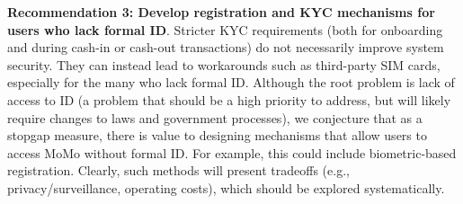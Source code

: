 \noindent \textbf{Recommendation 3: Develop registration and KYC mechanisms for users who lack formal ID}. 
Stricter KYC requirements (both for onboarding and during cash-in or cash-out transactions) do not necessarily improve system security. 
They can instead lead to workarounds such as third-party SIM cards, especially for the many who lack formal ID. 
Although the root problem is lack of access to ID (a problem that should be a high priority to address, but will likely require changes to laws and government processes), we conjecture that as a stopgap measure, there is value to designing mechanisms that allow users to access MoMo without formal ID. For example, this could include biometric-based registration. 
Clearly, such methods will present tradeoffs (e.g., privacy/surveillance, operating costs), which should be explored systematically.
